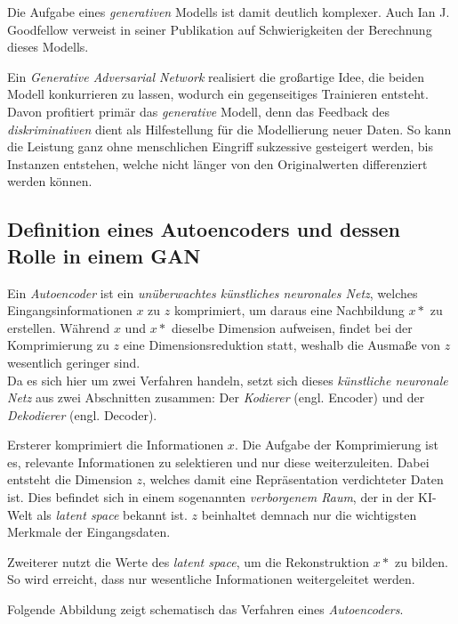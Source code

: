 Die Aufgabe eines \textit{generativen} Modells ist damit deutlich komplexer. Auch Ian J. Goodfellow verweist in seiner Publikation auf Schwierigkeiten der Berechnung dieses Modells. 

Ein \textit{Generative Adversarial Network} realisiert die großartige Idee, die beiden Modell konkurrieren zu lassen, wodurch ein gegenseitiges Trainieren entsteht. Davon profitiert primär das \textit{generative} Modell, denn das Feedback des \textit{diskriminativen} dient als Hilfestellung für die Modellierung neuer Daten.
So kann die Leistung ganz ohne menschlichen Eingriff sukzessive gesteigert werden, bis Instanzen entstehen, welche nicht länger von den Originalwerten differenziert werden können. 

\cite[vgl.][]{30}

\subsection{Definition eines Autoencoders und dessen Rolle in einem GAN}

Ein \textit{Autoencoder} ist ein \textit{unüberwachtes künstliches neuronales Netz}, welches Eingangsinformationen $x$ zu $z$ komprimiert, um daraus eine Nachbildung $x*$ zu erstellen.
Während $x$ und $x*$ dieselbe Dimension aufweisen, findet bei der Komprimierung zu $z$ eine Dimensionsreduktion statt, weshalb die Ausmaße von $z$ wesentlich geringer sind. \\

Da es sich hier um zwei Verfahren handeln, setzt sich dieses \textit{künstliche neuronale Netz} aus zwei Abschnitten zusammen: Der \textit{Kodierer} (engl. Encoder) und der \textit{Dekodierer} (engl. Decoder). 

Ersterer komprimiert die Informationen $x$. Die Aufgabe der Komprimierung ist es, relevante Informationen zu selektieren und nur diese weiterzuleiten. Dabei entsteht die Dimension $z$, welches damit eine Repräsentation verdichteter Daten ist. Dies befindet sich in einem sogenannten \textit{verborgenem Raum}, der in der KI-Welt als \textit{latent space} bekannt ist. $z$ beinhaltet demnach nur die wichtigsten Merkmale der Eingangsdaten. \cite{33}

Zweiterer nutzt die Werte des \textit{latent space}, um die Rekonstruktion $x*$ zu bilden. \\


So wird erreicht, dass nur wesentliche Informationen weitergeleitet werden.

Folgende Abbildung zeigt schematisch das Verfahren eines \textit{Autoencoders}. 

